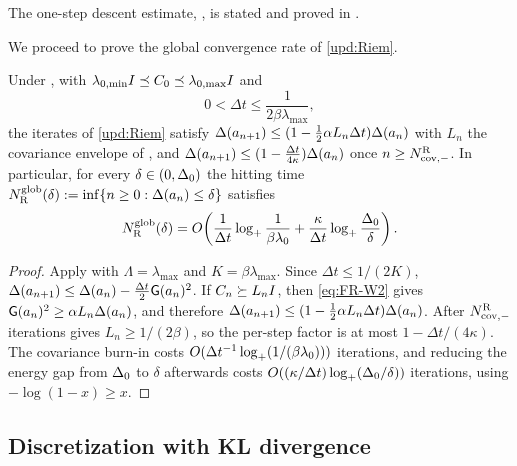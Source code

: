 The one-step descent estimate, , is stated and proved in
.

We proceed to prove the global convergence rate of \eqref{upd:Riem}.

\begin{theorem}\label{thm:glob-Riem}
    Under , with
    $\lambda_{0,\min}I\preceq C_0\preceq\lambda_{0,\max}I$ and
    \begin{equation*}
        0<\Delta t\leq\frac1{2\beta\lambda_{\max}},
    \end{equation*}
    the iterates of \eqref{upd:Riem} satisfy
    $\Delta(a_{n+1})\leq(1-\tfrac12\alpha L_n\Delta t)\Delta(a_n)$ with $L_n$ the covariance
    envelope of , and
    $\Delta(a_{n+1})\leq(1-\tfrac{\Delta t}{4\kappa})\Delta(a_n)$ once
    $n\geq N_{\mathrm{cov},-}^{\mathrm{R}}$. In particular, for every $\delta\in(0,\Delta_0)$ the hitting
    time $N_{\mathrm{R}}^{\mathrm{glob}}(\delta):=\inf\{n\geq0:\Delta(a_n)\leq\delta\}$ satisfies
    \begin{equation*}
        N_{\mathrm{R}}^{\mathrm{glob}}(\delta)
        =
        O\!\left(
            \frac1{\Delta t}\log_+\frac1{\beta\lambda_0}
            +\frac\kappa{\Delta t}\log_+\frac{\Delta_0}\delta
        \right).
    \end{equation*}
\end{theorem}

\begin{proof}
    Apply  with $\Lambda=\lambda_{\max}$ and $K=\beta\lambda_{\max}$.
    Since $\Delta t\leq1/(2K)$,
    $\Delta(a_{n+1})\leq\Delta(a_n)-\tfrac{\Delta t}2\mathsf{G}(a_n)^2$. If
    $C_n\succeq L_nI$, then \eqref{eq:FR-W2} gives
    $\mathsf{G}(a_n)^2\geq\alpha L_n\Delta(a_n)$, and therefore
    $\Delta(a_{n+1})\leq(1-\tfrac12\alpha L_n\Delta t)\Delta(a_n)$. After
    $N_{\mathrm{cov},-}^{\mathrm{R}}$ iterations  gives $L_n\geq1/(2\beta)$, so the
    per-step factor is at most $1-\Delta t/(4\kappa)$. The covariance burn-in costs
    $O(\Delta t^{-1}\log_+(1/(\beta\lambda_0)))$ iterations, and reducing the energy gap from
    $\Delta_0$ to $\delta$ afterwards costs
    $O((\kappa/\Delta t)\log_+(\Delta_0/\delta))$ iterations, using $-\log(1-x)\geq x$.
\end{proof}

\subsection{Discretization with KL divergence}

